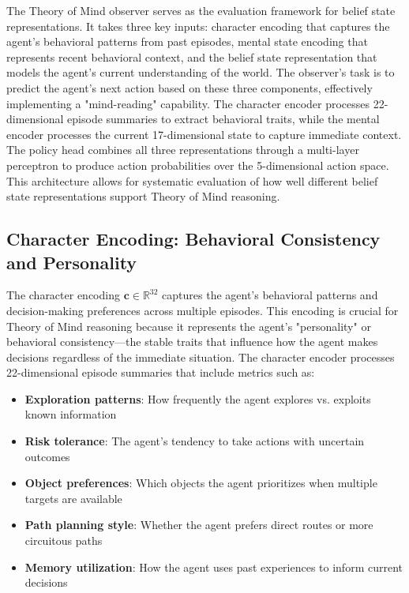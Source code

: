 \documentclass[11pt]{article}
\begin{document}
The Theory of Mind observer serves as the evaluation framework for belief state representations. It takes three key inputs: character encoding that captures the agent's behavioral patterns from past episodes, mental state encoding that represents recent behavioral context, and the belief state representation that models the agent's current understanding of the world. The observer's task is to predict the agent's next action based on these three components, effectively implementing a "mind-reading" capability. The character encoder processes 22-dimensional episode summaries to extract behavioral traits, while the mental encoder processes the current 17-dimensional state to capture immediate context. The policy head combines all three representations through a multi-layer perceptron to produce action probabilities over the 5-dimensional action space. This architecture allows for systematic evaluation of how well different belief state representations support Theory of Mind reasoning.

\subsection{Character Encoding: Behavioral Consistency and Personality}

The character encoding $\mathbf{c} \in \mathbb{R}^{32}$ captures the agent's behavioral patterns and decision-making preferences across multiple episodes. This encoding is crucial for Theory of Mind reasoning because it represents the agent's "personality" or behavioral consistency—the stable traits that influence how the agent makes decisions regardless of the immediate situation. The character encoder processes 22-dimensional episode summaries that include metrics such as:

\begin{itemize}
    \item \textbf{Exploration patterns}: How frequently the agent explores vs. exploits known information
    \item \textbf{Risk tolerance}: The agent's tendency to take actions with uncertain outcomes
    \item \textbf{Object preferences}: Which objects the agent prioritizes when multiple targets are available
    \item \textbf{Path planning style}: Whether the agent prefers direct routes or more circuitous paths
    \item \textbf{Memory utilization}: How the agent uses past experiences to inform current decisions
\end{itemize}
\end{document}
